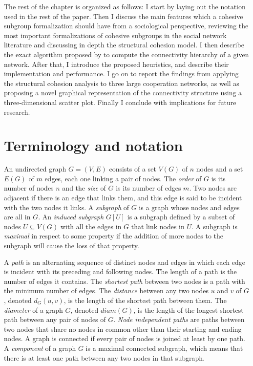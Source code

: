 The rest of the chapter is organized as follows: I start by laying out the notation used in the rest of the paper. Then I discuss the main features which a cohesive subgroup formalization should have from a sociological perspective, reviewing the most important formalizations of cohesive subgroups in the social network literature and discussing in depth the structural cohesion model. I then describe the exact algorithm proposed by \citet{moody:2003} to compute the connectivity hierarchy of a given network. After that, I introduce the proposed heuristics, and describe their implementation and performance. I go on to report the findings from applying the structural cohesion analysis to three large cooperation networks, as well as proposing a novel graphical representation of the connectivity structure using a three-dimensional scatter plot. Finally I conclude with implications for future research.

\section{Terminology and notation}

An undirected graph $G=(V,E)$ consists of a set $V(G)$ of $n$ nodes and a set $E(G)$ of $m$ edges, each one linking a pair of nodes. The \emph{order} of $G$ is its number of nodes $n$ and the \emph{size} of $G$ is its number of edges $m$. Two nodes are adjacent if there is an edge that links them, and this edge is said to be incident with the two nodes it links. A \emph{subgraph} of $G$ is a graph whose nodes and edges are all in $G$. An \emph{induced subgraph} $G[U]$ is a subgraph defined by a subset of nodes $U \subseteq V(G)$ with all the edges in $G$ that link nodes in $U$. A subgraph is \emph{maximal} in respect to some property if the addition of more nodes to the subgraph will cause the loss of that property.

A \emph{path} is an alternating sequence of distinct nodes and edges in which each edge is incident with its preceding and following nodes. The length of a path is the number of edges it contains. The \emph{shortest path} between two nodes is a path with the minimum number of edges. The \emph{distance} between any two nodes $u$ and $v$ of $G$, denoted $d_{G}(u,v)$, is the length of the shortest path between them. The \emph{diameter} of a graph $G$, denoted $diam(G)$, is the length of the longest shortest path between any pair of nodes of $G$. \emph{Node independent paths} are paths between two nodes that share no nodes in common other than their starting and ending nodes. A graph is connected if every pair of nodes is joined at least by one path. A \emph{component} of a graph $G$ is a maximal connected subgraph, which means that there is at least one path between any two nodes in that subgraph.

